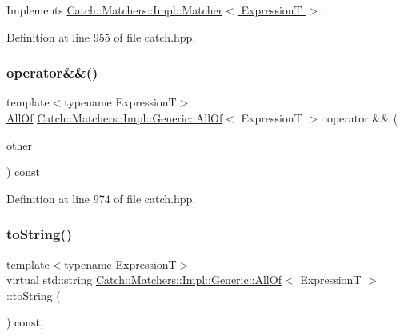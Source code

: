 Implements \hyperlink{struct_catch_1_1_matchers_1_1_impl_1_1_matcher_a8c1c5511ce1f3738a45e6901b558f583}{Catch\+::\+Matchers\+::\+Impl\+::\+Matcher$<$ Expression\+T $>$}.



Definition at line 955 of file catch.\+hpp.

\hypertarget{class_catch_1_1_matchers_1_1_impl_1_1_generic_1_1_all_of_aca6497aaa7fdb6560ebe850f32ccbf15}{}\label{class_catch_1_1_matchers_1_1_impl_1_1_generic_1_1_all_of_aca6497aaa7fdb6560ebe850f32ccbf15} 
\subsubsection{\texorpdfstring{operator\&\&()}{operator\&\&()}}
{\footnotesize\ttfamily template$<$typename ExpressionT$>$ \\
\hyperlink{class_catch_1_1_matchers_1_1_impl_1_1_generic_1_1_all_of}{All\+Of} \hyperlink{class_catch_1_1_matchers_1_1_impl_1_1_generic_1_1_all_of}{Catch\+::\+Matchers\+::\+Impl\+::\+Generic\+::\+All\+Of}$<$ ExpressionT $>$\+::operator \&\& (\begin{DoxyParamCaption}\item[{\hyperlink{struct_catch_1_1_matchers_1_1_impl_1_1_matcher}{Matcher}$<$ ExpressionT $>$ const \&}]{other }\end{DoxyParamCaption}) const\hspace{0.3cm}{\ttfamily [inline]}}



Definition at line 974 of file catch.\+hpp.

\hypertarget{class_catch_1_1_matchers_1_1_impl_1_1_generic_1_1_all_of_a8c8e7742501dc81e51a3c745d6f74119}{}\label{class_catch_1_1_matchers_1_1_impl_1_1_generic_1_1_all_of_a8c8e7742501dc81e51a3c745d6f74119} 
\subsubsection{\texorpdfstring{to\+String()}{toString()}}
{\footnotesize\ttfamily template$<$typename ExpressionT$>$ \\
virtual std\+::string \hyperlink{class_catch_1_1_matchers_1_1_impl_1_1_generic_1_1_all_of}{Catch\+::\+Matchers\+::\+Impl\+::\+Generic\+::\+All\+Of}$<$ ExpressionT $>$\+::to\+String (\begin{DoxyParamCaption}{ }\end{DoxyParamCaption}) const\hspace{0.3cm}{\ttfamily [inline]}, {\ttfamily [virtual]}}




